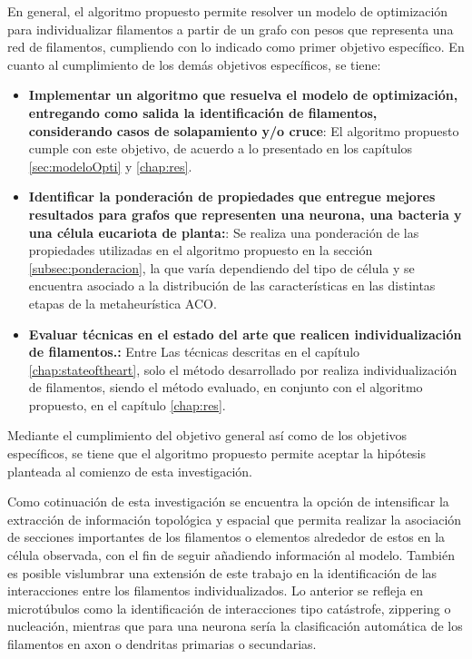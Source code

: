 En general, el algoritmo propuesto permite resolver un modelo de optimizaci\'on para individualizar filamentos a partir de un grafo con pesos que representa una red de filamentos, cumpliendo con lo indicado como primer objetivo espec\'ifico. En cuanto al cumplimiento de los dem\'as objetivos espec\'ificos, se tiene:
\begin{itemize}
    \item {\bf Implementar un algoritmo que resuelva el modelo de optimizaci\'on, entregando como salida la identificaci\'on de filamentos, considerando casos de solapamiento y/o cruce}: El algoritmo propuesto cumple con este objetivo, de acuerdo a lo presentado en los cap\'itulos \ref{sec:modeloOpti} y \ref{chap:res}.
    
    \item {\bf Identificar la ponderaci\'on de propiedades que entregue mejores resultados para grafos que representen una neurona, una bacteria y una c\'elula eucariota de planta:}: Se realiza una ponderaci\'on de las propiedades utilizadas en el algoritmo propuesto en la secci\'on \ref{subsec:ponderacion}, la que var\'ia dependiendo del tipo de c\'elula y se encuentra asociado a la distribuci\'on de las caracter\'isticas en las distintas etapas de la metaheur\'istica ACO.
    
    \item {\bf Evaluar t\'ecnicas en el estado del arte que realicen individualizaci\'on de filamentos.:} Entre Las t\'ecnicas descritas en el cap\'itulo \ref{chap:stateoftheart}, solo el m\'etodo desarrollado por  realiza individualizaci\'on de filamentos, siendo el m\'etodo evaluado, en conjunto con el algoritmo propuesto, en el cap\'itulo \ref{chap:res}.
    
\end{itemize}

Mediante el cumplimiento del objetivo general as\'i como de los objetivos espec\'ificos, se tiene que el algoritmo propuesto permite aceptar la hip\'otesis planteada al comienzo de esta investigaci\'on.

Como cotinuaci\'on de esta investigaci\'on se encuentra la opci\'on de intensificar la extracci\'on de informaci\'on topol\'ogica y espacial que permita realizar la asociaci\'on de secciones importantes de los filamentos o elementos alrededor de estos en la c\'elula observada, con el fin de seguir a\~nadiendo informaci\'on al modelo. Tambi\'en es posible vislumbrar una extensi\'on de este trabajo en la identificaci\'on de las interacciones entre los filamentos individualizados. Lo anterior se refleja en microt\'ubulos como la identificaci\'on de interacciones tipo cat\'astrofe, zippering o nucleaci\'on, mientras que para una neurona ser\'ia la clasificaci\'on autom\'atica de los filamentos en axon o dendritas primarias o secundarias.
